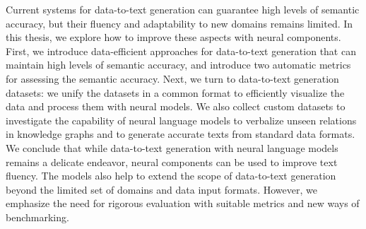 Current systems for data-to-text generation can guarantee high levels of semantic accuracy, but their fluency and adaptability to new domains remains limited. In this thesis, we explore how to improve these aspects with neural components. First, we introduce data-efficient approaches for data-to-text generation that can maintain high levels of semantic accuracy, and introduce two automatic metrics for assessing the semantic accuracy. Next, we turn to data-to-text generation datasets: we unify the datasets in a common format to efficiently visualize the data and process them with neural models. We also collect custom datasets to investigate the capability of neural language models to verbalize unseen relations in knowledge graphs and to generate accurate texts from standard data formats. We conclude that while data-to-text generation with neural language models remains a delicate endeavor, neural components can be used to improve text fluency. The models also help to extend the scope of data-to-text generation beyond the limited set of domains and data input formats. However, we emphasize the need for rigorous evaluation with suitable metrics and new ways of benchmarking.